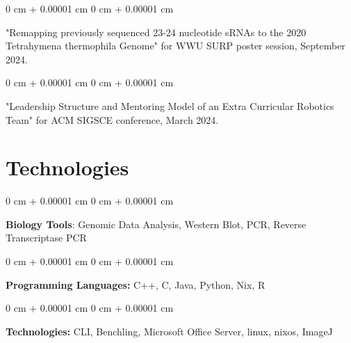\documentclass[10pt, letterpaper]{article}
\newenvironment{onecolentry}{
    \begin{adjustwidth}{
        0 cm + 0.00001 cm
    }{
        0 cm + 0.00001 cm
    }
}{
    \end{adjustwidth}
} %
\begin{document}
        \begin{onecolentry}
"Remapping previously sequenced 23-24 nucleotide sRNAs to the 2020 Tetrahymena thermophila Genome" for WWU SURP poster session, September 2024.
            \begin{onecolentry}

"Leadership Structure and Mentoring Model of an Extra Curricular Robotics Team" for ACM SIGSCE conference, March 2024.
        \end{onecolentry}

        \end{onecolentry}





    \section{Technologies}



        \begin{onecolentry}
            {\textbf{Biology Tools}:} Genomic Data Analysis, Western Blot, PCR, Reverse Transcriptase PCR
        \end{onecolentry}
        \vspace{0.2 cm}
        \begin{onecolentry}
            \textbf{Programming Languages:} C++, C, Java, Python, Nix, R
        \end{onecolentry}

        \vspace{0.2 cm}

        \begin{onecolentry}
            \textbf{Technologies:} CLI, Benchling, Microsoft Office Server, linux, nixos, ImageJ
        \end{onecolentry}
\end{document}
